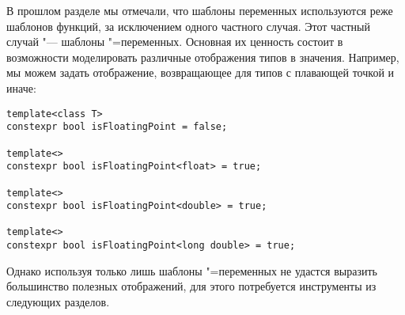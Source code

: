В прошлом разделе мы отмечали, что шаблоны переменных используются реже шаблонов функций, за исключением одного частного случая.
Этот частный случай "--- шаблоны "=переменных.
Основная их ценность состоит в возможности моделировать различные отображения типов в значения.
Например, мы можем задать отображение, возвращающее  для типов с плавающей точкой и  иначе:
\begin{verbatim}
template<class T>
constexpr bool isFloatingPoint = false;

template<>
constexpr bool isFloatingPoint<float> = true;

template<>
constexpr bool isFloatingPoint<double> = true;

template<>
constexpr bool isFloatingPoint<long double> = true;
\end{verbatim}
Однако используя только лишь шаблоны "=переменных не удастся выразить большинство полезных отображений, для этого потребуется инструменты из следующих разделов.

